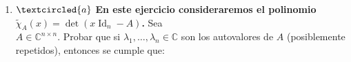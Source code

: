 \documentclass[12pt]{amsart}
\begin{document}
\begin{enumerate}[resume]
%
%
%
%

\

\item\label{complejos} $\textcircled{a}$ {\bf En este ejercicio consideraremos el polinomio $\tilde\chi_A(x)=\det(x\operatorname{Id}_n-A)$.} Sea \\ $A\in\mathbb{C}^{n\times n}$. Probar que si $\lambda_1,\dots,\lambda_n \in \mathbb C$ son los autovalores de $A$
(posiblemente repetidos), entonces se cumple que:


\end{enumerate}
\end{document}
